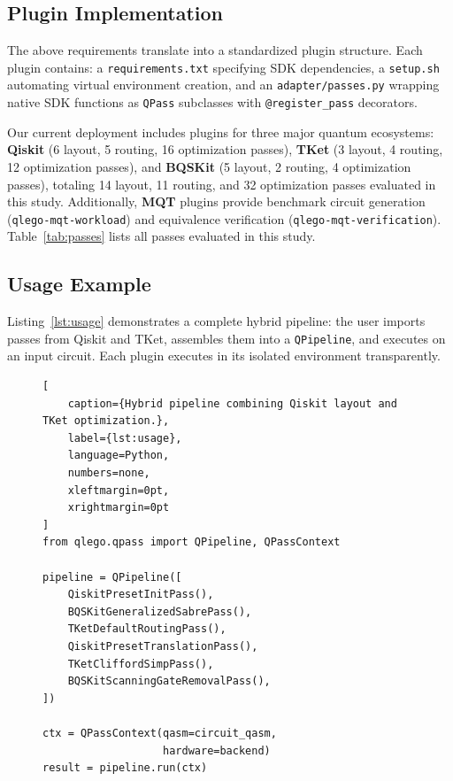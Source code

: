 \documentclass[conference]{IEEEtran}
\begin{document}
\subsection{Plugin Implementation}

The above requirements translate into a standardized plugin structure.
Each plugin contains: a \texttt{requirements.txt} specifying SDK dependencies, a \texttt{setup.sh} automating virtual environment creation, and an \texttt{adapter/passes.py} wrapping native SDK functions as \texttt{QPass} subclasses with \texttt{@register\_pass} decorators.

Our current deployment includes plugins for three major quantum ecosystems:
\textbf{Qiskit} (6 layout, 5 routing, 16 optimization passes),
\textbf{TKet} (3 layout, 4 routing, 12 optimization passes), and
\textbf{BQSKit} (5 layout, 2 routing, 4 optimization passes),
totaling 14 layout, 11 routing, and 32 optimization passes evaluated in this study.
Additionally, \textbf{MQT} plugins provide benchmark circuit generation (\texttt{qlego-mqt-workload}) and equivalence verification (\texttt{qlego-mqt-verification}).
Table~\ref{tab:passes} lists all passes evaluated in this study.

\subsection{Usage Example}

Listing~\ref{lst:usage} demonstrates a complete hybrid pipeline: the user imports passes from Qiskit and TKet, assembles them into a \texttt{QPipeline}, and executes on an input circuit.
Each plugin executes in its isolated environment transparently.

\begin{figure}[t]
\begin{lstlisting}[
    caption={Hybrid pipeline combining Qiskit layout and TKet optimization.},
    label={lst:usage},
    language=Python,
    numbers=none,
    xleftmargin=0pt,
    xrightmargin=0pt
]
from qlego.qpass import QPipeline, QPassContext

pipeline = QPipeline([
    QiskitPresetInitPass(),
    BQSKitGeneralizedSabrePass(),
    TKetDefaultRoutingPass(),
    QiskitPresetTranslationPass(),
    TKetCliffordSimpPass(),
    BQSKitScanningGateRemovalPass(),
])

ctx = QPassContext(qasm=circuit_qasm,
                   hardware=backend)
result = pipeline.run(ctx)
\end{lstlisting}
\end{figure}
\end{document}
